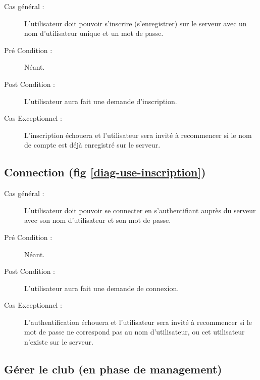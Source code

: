 \documentclass[a4paper]{report}
\begin{document}
\begin{description}
    \item[Cas général  :] L'\gls{utilisateur} doit pouvoir s'inscrire (s'enregistrer) sur le \gls{serveur} avec un nom d'\gls{utilisateur} unique et un mot de passe.
    \item[Pré Condition  :] Néant.
    \item[Post Condition :] L'\gls{utilisateur} aura fait une demande d'inscription.
    \item[Cas Exceptionnel :] L'inscription échouera et l'\gls{utilisateur} sera invité à recommencer si le nom de compte est déjà enregistré sur le \gls{serveur}.
\end{description}

\subsection{Connection (fig \ref{diag-use-inscription})}
\begin{description}
    \item[Cas général :] L'\gls{utilisateur} doit pouvoir se connecter en s'authentifiant auprès du \gls{serveur} avec son nom d'\gls{utilisateur} et son mot de passe.
    \item[Pré Condition  :] Néant.
    \item[Post Condition :] L'\gls{utilisateur} aura fait une demande de connexion.
    \item[Cas Exceptionnel :] L'authentification échouera et l'\gls{utilisateur} sera invité à recommencer si le mot de passe ne correspond pas au nom d'\gls{utilisateur}, ou cet \gls{utilisateur} n'existe sur le \gls{serveur}.
\end{description}

\subsection{Gérer le \gls{club} (en phase de management)}

\end{document}
